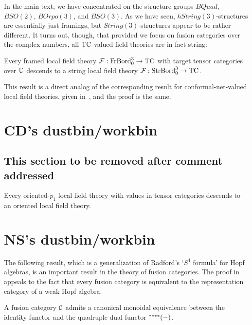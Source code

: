 \documentclass{amsart}
\begin{document}
In the main text, we have concentrated on the structure groups $BQuad$, $BSO(2)$, $BOrpo(3)$, and $BSO(3)$.  As we have seen, $hString(3)$-structures are essentially just framings, but $String(3)$-structures appear to be rather different.  It turns out, though, that provided we focus on fusion categories over the complex numbers, all $\mathrm{TC}$-valued field theories are in fact string:

\begin{proposition} \label{prop-string}
Every framed local field theory $\mathcal F : \mathrm{FrBord}_0^3 \rightarrow \mathrm{TC}$ with target tensor categories over $\mathbb C$ descends to a string local field theory $\overline{\mathcal F} : \mathrm{StrBord}_0^3 \rightarrow \mathrm{TC}$.
\end{proposition}

\nid This result is a direct analog of the corresponding result for conformal-net-valued local field theories, given in~\cite{0912.5307}, and the proof is the same.


\section{CD's dustbin/workbin}

\subsection{This section to be removed after comment addressed} \label{sec-pivot-struc}

\begin{conjecture}
Every oriented-$p_1$ local field theory with values in tensor categories descends to an oriented local field theory.
\end{conjecture}


\section{NS's dustbin/workbin}

The following result, which is a generalization of Radford's `$S^4$ formula' for Hopf algebras, is an important result in the theory of fusion categories. The proof in \cite{MR2183279} appeals to the fact that every fusion category is equivalent to the representation category of a weak Hopf algebra.  

\begin{theorem}[\cite{MR2183279}]
	A fusion category $\mathcal C$ admits a canonical monoidal equivalence between the identity functor and the quadruple dual functor ${}^{****}{(-)}$.
\end{theorem}
\end{document}
